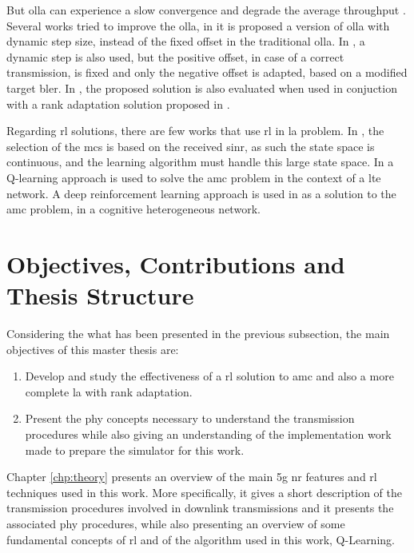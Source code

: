 But \gls{olla} can experience a slow convergence and degrade the average throughput \cite{10.1145/3341216.3342212}.
%
Several works tried to improve the \gls{olla}, in \cite{Blanquez-Casado2016} it is proposed a version of \gls{olla} with dynamic step size, instead of the fixed offset in the traditional \gls{olla}.
%
In \cite{Sarret2015}, a dynamic step is also used, but the positive offset, in case of a correct transmission, is fixed and only the negative offset is adapted, based on a modified target \gls{bler}.
%
In \cite{Sarret2015}, the proposed solution is also evaluated when used in conjuction with a rank adaptation solution proposed in \cite{catania2015distributed}.

Regarding \gls{rl} solutions, there are few works that use \gls{rl} in \gls{la} problem.
%
In \cite{continuousState}, the selection of the \gls{mcs} is based on the received \gls{sinr}, as such the state space is continuous, and the learning algorithm must handle this large state space.
%
In \cite{bruno2014robust} a Q-learning approach is used to solve the \gls{amc} problem in the context of a \gls{lte} network.
%
A deep reinforcement learning approach is used in \cite{DRL_AMC} as a solution to the \gls{amc} problem, in a cognitive heterogeneous network.


\section{Objectives, Contributions and Thesis Structure}

Considering the what has been presented in the previous subsection, the main objectives of this master thesis are:
\begin{enumerate}
    \item Develop and study the effectiveness of a \gls{rl} solution to \gls{amc} and also a more complete \gls{la} with rank adaptation.
    \item Present the \gls{phy} concepts necessary to understand the transmission procedures while also giving an understanding of the implementation work made to prepare the simulator for this work.
\end{enumerate}

Chapter \ref{chp:theory} presents an overview of the main \gls{5g} \gls{nr} features and \gls{rl} techniques used in this work.
%
More specifically, it gives a short description of the transmission procedures involved in downlink transmissions and it presents the associated \gls{phy} procedures, while also presenting an overview of some fundamental concepts of \gls{rl} and of the algorithm used in this work, Q-Learning.

